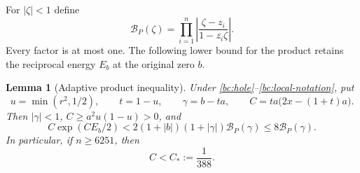 \documentclass[11pt,reqno]{amsart}
\numberwithin{equation}{section}
\newtheorem{lemma}[theorem]{Lemma}
\theoremstyle{definition}
\theoremstyle{remark}
\begin{document}
For $|\zeta|<1$ define
\[
 \mathcal B_P(\zeta)=
 \prod_{i=1}^n\left|\frac{\zeta-z_i}{1-\overline{z_i}\zeta}\right|.
\]
Every factor is at most one.  The following lower bound for the product
retains the reciprocal energy $E_b$ at the original zero $b$.

\begin{lemma}[Adaptive product inequality]\label{bc:blaschke}
Under \eqref{bc:hole}--\eqref{bc:local-notation}, put
\begin{equation}\label{bc:adaptive-def}
 u=\min(r^2,1/2),\qquad t=1-u,\qquad
 \gamma=b-ta,\qquad C=ta\bigl(2x-(1+t)a\bigr).
\end{equation}
Then $|\gamma|<1$, $C\geq a^2u(1-u)>0$, and
\begin{equation}\label{bc:blaschke-bound}
 C\exp(CE_b/2)
 <2(1+|b|)(1+|\gamma|)\mathcal B_P(\gamma)
 \leq8\mathcal B_P(\gamma).
\end{equation}
In particular, if $n\geq6251$, then
\begin{equation}\label{bc:Ccap}
 C<C_*:=\frac1{388}.
\end{equation}
\end{lemma}
\end{document}
